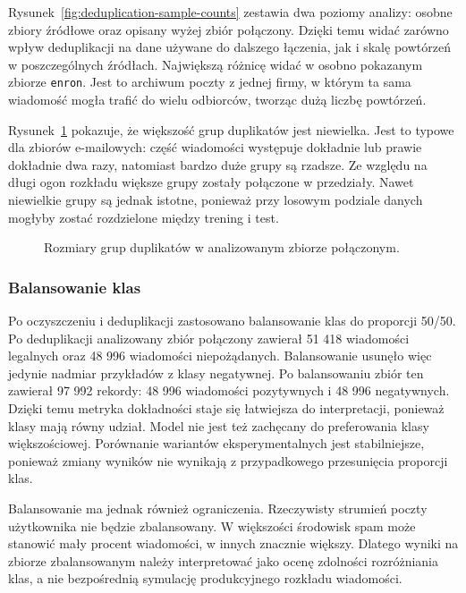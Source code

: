 Rysunek~\ref{fig:deduplication-sample-counts} zestawia dwa poziomy analizy:
osobne zbiory źródłowe oraz opisany wyżej zbiór połączony.
Dzięki temu widać zarówno wpływ deduplikacji na dane używane do dalszego
łączenia, jak i skalę powtórzeń w poszczególnych źródłach. Największą różnicę
widać w osobno pokazanym zbiorze \texttt{enron}. Jest to archiwum poczty z jednej
firmy, w którym ta sama wiadomość mogła trafić do wielu odbiorców, tworząc dużą
liczbę powtórzeń.

Rysunek~\ref{fig:duplicate-group-sizes} pokazuje, że większość grup duplikatów
jest niewielka. Jest to typowe dla zbiorów e-mailowych: część wiadomości
występuje dokładnie lub prawie dokładnie dwa razy, natomiast bardzo duże grupy
są rzadsze. Ze względu na długi ogon rozkładu większe grupy zostały połączone
w przedziały. Nawet niewielkie grupy są jednak istotne, ponieważ przy losowym
podziale danych mogłyby zostać rozdzielone między trening i test.

\begin{figure}[htbp]
\centering

\caption{Rozmiary grup duplikatów w analizowanym zbiorze połączonym.}
\label{fig:duplicate-group-sizes}
\end{figure}

\subsubsection{Balansowanie klas}

Po oczyszczeniu i deduplikacji zastosowano balansowanie klas do proporcji 50/50.
Po deduplikacji analizowany zbiór połączony
zawierał 51 418 wiadomości legalnych oraz 48 996 wiadomości niepożądanych.
Balansowanie usunęło więc jedynie nadmiar przykładów z klasy negatywnej.
Po balansowaniu zbiór ten zawierał 97 992 rekordy: 48 996 wiadomości pozytywnych i
48 996 negatywnych. Dzięki temu metryka dokładności staje się łatwiejsza do
interpretacji, ponieważ klasy mają równy udział. Model nie jest też zachęcany
do preferowania klasy większościowej. Porównanie wariantów eksperymentalnych
jest stabilniejsze, ponieważ zmiany wyników nie wynikają z przypadkowego
przesunięcia proporcji klas.

Balansowanie ma jednak również ograniczenia. Rzeczywisty strumień poczty
użytkownika nie będzie zbalansowany. W większości środowisk spam może
stanowić mały procent wiadomości, w innych znacznie większy. Dlatego wyniki na
zbiorze zbalansowanym należy interpretować jako ocenę zdolności rozróżniania
klas, a nie bezpośrednią symulację produkcyjnego rozkładu wiadomości.

